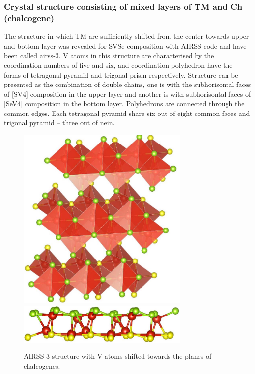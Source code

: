 \documentclass[a4paperm]{article}
\begin{document}
\subsubsection{Crystal structure consisting of mixed layers of TM and Ch (chalcogene)}

The structure in which TM are sufficiently shifted from the center towards upper and bottom layer was revealed for SVSe composition with AIRSS code and have been called airss-3.
V atoms in this structure are characterised by the coordination numbers of five and six, and coordination polyhedron have the forms of tetragonal pyramid and trigonal prism respectively.
Structure can be presented as the combination of double chains, one is with the subhorisontal faces of [SV4] composition in the upper layer and another is with subhorisontal faces of [SeV4] composition in the bottom layer.
Polyhedrons are connected through the common edges.
Each tetragonal pyramid share six out of eight common faces and trigonal pyramid – three out of nein.

\begin{figure}[H]
        \includegraphics[width=0.75\textwidth]{airss-3-1.jpg} \\ \vspace{3mm}
        \includegraphics[width=0.75\textwidth]{airss-3-2.jpg}
        \caption{AIRSS-3 structure with V atoms shifted towards the planes of chalcogenes.}
\label{airss-1}
\end{figure}
\end{document}
